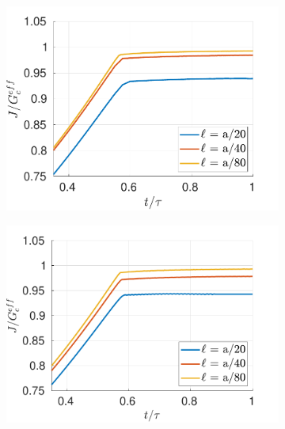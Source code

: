 \begin{figure}[h]
\begin{subfigure}{.33\textwidth}
  \centering
  \includegraphics[width=\linewidth]{images/2d_propagation/zoom_bourdin_I_d.pdf}
  \caption{}
  \label{fig:prop_bourdin_d}
\end{subfigure}%
\begin{subfigure}{.33\textwidth}
  \centering
  \includegraphics[width=\linewidth]{images/2d_propagation/zoom_bourdin_I_d2.pdf}
  \caption{}
  \label{fig:fig:prop_bourdin_d2}
\end{subfigure}%
\begin{subfigure}{.33\textwidth}
  \centering

\end{subfigure}
\end{figure}
